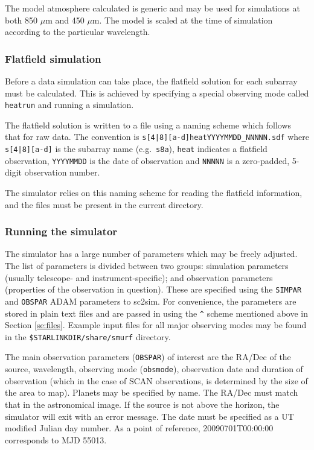 \documentclass[twoside,11pt]{article}
\newcommand{\xref}[3]{#1}
\renewcommand{\_}{\texttt{\symbol{95}}}
\newcommand{\task}[1]{\textsf{#1}}
\newcommand{\sctwosim}{\xref{\task{sc2sim}}{sun258}{SC2SIM}}
\begin{document}
The model atmosphere calculated is generic and may be used for
simulations at both 850 $\mu$m and 450 $\mu$m. The model is scaled
at the time of simulation according to the particular wavelength.

\subsubsection{Flatfield simulation}

Before a data simulation can take place, the flatfield solution for
each subarray must be calculated. This is achieved by specifying a
special observing mode called \texttt{heatrun} and running a
simulation.

The flatfield solution is written to a file using a naming scheme
which follows that for raw data. The convention is
\verb+s[4|8][a-d]heatYYYYMMDD_NNNNN.sdf+ where \verb+s[4|8][a-d]+ is
the subarray name (e.g.\ \verb+s8a+), \verb+heat+ indicates a
flatfield observation, \verb+YYYYMMDD+ is the date of observation and
\verb+NNNNN+ is a zero-padded, 5-digit observation number.

The simulator relies on this naming scheme for reading the flatfield
information, and the files must be present in the current directory.

\subsubsection{Running the simulator}

The simulator has a large number of parameters which may be freely
adjusted. The list of parameters is divided between two groups:
simulation parameters (usually telescope- and instrument-specific); and
observation parameters (properties of the observation in
question). These are specified using the \texttt{SIMPAR} and
\texttt{OBSPAR} ADAM parameters to \sctwosim. For convenience, the
parameters are stored in plain text files and are passed in using the
\verb+^+ scheme mentioned above in Section \ref{se:files}. Example
input files for all major observing modes may be found in the
\texttt{\$STARLINK\_DIR/share/smurf} directory.

The main observation parameters (\texttt{OBSPAR}) of interest are the
RA/Dec of the source, wavelength, observing mode (\texttt{obsmode}),
observation date and duration of observation (which in the case of
SCAN observations, is determined by the size of the area to
map). Planets may be specified by name. The RA/Dec must match that in
the astronomical image. If the source is not above the horizon, the
simulator will exit with an error message. The date must be specified
as a UT modified Julian day number. As a point of reference,
20090701T00:00:00 corresponds to MJD 55013.
\end{document}
